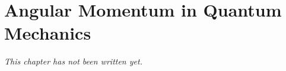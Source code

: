 \chapter{Angular Momentum in Quantum Mechanics}\label{ch:b3:quantum-angular-momentum}


\emph{This chapter has not been written yet.}
